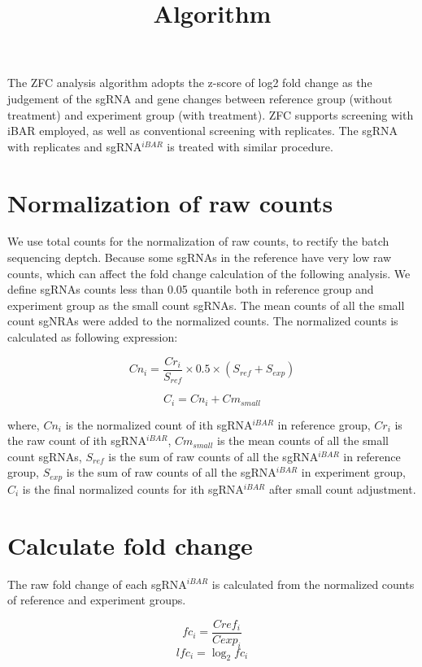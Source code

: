 \documentclass[11pt, a4paper]{article}
\title{Algorithm}
\begin{document}
\maketitle

The ZFC analysis algorithm adopts the z-score of log2 fold change as
the judgement of the sgRNA and gene changes between reference group
(without treatment) and experiment group (with treatment). ZFC
supports screening with iBAR \citep{zhu_guide_2019} employed, as
well as conventional screening with replicates. The sgRNA with
replicates and sgRNA$^{iBAR}$ is treated with similar procedure.

\section{Normalization of raw counts}

We use total counts for the normalization of raw counts, to rectify
the batch sequencing deptch. Because some sgRNAs in the reference have
very low raw counts, which can affect the fold change calculation of
the following analysis. We define sgRNAs counts less than 0.05
quantile both in reference group and experiment group as the small
count sgRNAs. The mean counts of all the small count sgNRAs were added
to the normalized counts. The normalized counts is calculated as
following expression:

$$Cn_{i} = \frac{Cr_{i}}{S_{ref}} \times 0.5 \times (S_{ref} + S_{exp})$$

$$C_{i} = Cn_{i} + Cm_{small}$$

where, $Cn_{i}$ is the normalized count of ith sgRNA$^{iBAR}$ in
reference group, $Cr_{i}$ is the raw count of ith sgRNA$^{iBAR}$,
$Cm_{small}$ is the mean counts of all the small count sgRNAs,
$S_{ref}$ is the sum of raw counts of all the sgRNA$^{iBAR}$ in
reference group, $S_{exp}$ is the sum of raw counts of all the
sgRNA$^{iBAR}$ in experiment group, $C_{i}$ is the final normalized
counts for ith sgRNA$^{iBAR}$ after small count adjustment.


\section{Calculate fold change}

The raw fold change of each sgRNA$^{iBAR}$ is calculated from the
normalized counts of reference and experiment groups.

$$fc_{i} = \frac{Cref_{i}}{Cexp_{i}}$$
$$lfc_{i} = \log_{2}fc_{i}$$
\end{document}
